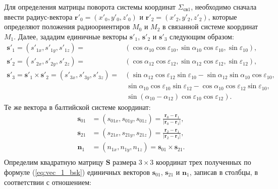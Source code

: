 \documentclass[../main.tex]{subfiles}
\begin{document}
Для определения матрицы поворота системы координат $\Sigma_{\text{св}1}$, необходимо сначала ввести радиус-вектора $\mathbf{r}'_0 = \left(x'_0, y'_0, z'_0\right)$ и $\mathbf{r}'_2 = \left(x'_2, y'_2, z'_2\right)$, которые определяют положения радиоориентиров $M_0$ и $M_2$ в связанной системе координат $M_1$. Далее, зададим единичные векторы $\mathbf{s}'_1$, $\mathbf{s}'_2$ и $\mathbf{s}'_3$ следующим образом:
\begin{equation}\label{eq:vec_1_local}
    \begin{split}
    \mathbf{s}'_1 = \left(s'_{1x}, s'_{1y}, s'_{1z}\right) = &\left(\cos\alpha_{10} \cos\varepsilon_{10}, \sin\alpha_{10}\cos\varepsilon_{10}, \sin\varepsilon_{10}\right),\\
    \mathbf{s}'_2 = \left(s'_{2x}, s'_{2y}, s'_{2z}\right) = &\left(\cos\alpha_{12} \cos\varepsilon_{12}, \sin\alpha_{12}\cos\varepsilon_{12}, \sin\varepsilon_{12}\right),\\
    \mathbf{s}'_3 = \mathbf{s}'_1 \times \mathbf{s}'_2 = \left(s'_{3x}, s'_{3y}, s'_{3z}\right) = &\left(\sin\alpha_{12}\cos\varepsilon_{12}\sin\varepsilon_{10} - \sin\alpha_{12}\sin\alpha_{10}\cos\varepsilon_{10},\right.\\
    &\ \sin\alpha_{10}\cos\varepsilon_{10}\sin\varepsilon_{12} - \cos\alpha_{10}\cos\varepsilon_{12}\sin\varepsilon_{10},\\
    &\ \left.\sin\left(\alpha_{10} - \alpha_{12}\right)\cos\varepsilon_{10}\cos\varepsilon_{12}\right).
    \end{split}
\end{equation}
Те же вектора в балтийской системе координат:
\begin{equation}\label{eq:vec_1_bsk}
    \begin{split}
        \mathbf{s}_{01} &= \left(s_{01x}, s_{01y}, s_{01z}\right) = \frac{\mathbf{r}_0 - \mathbf{r}_1}{|\mathbf{r}_0 - \mathbf{r}_1|},\\
        \mathbf{s}_{21} &= \left(s_{21x}, s_{21y}, s_{21z}\right) = \frac{\mathbf{r}_2 - \mathbf{r}_1}{|\mathbf{r}_2 - \mathbf{r}_1|},\\
        \mathbf{n}_1 &= \left(n_{1x}, n_{1y}, n_{1z}\right) = \mathbf{s}_{01} \times \mathbf{s}_{21}.\\
    \end{split}
\end{equation}
Определим квадратную матрицу $\mathbf{S}$ размера $3 \times 3$ координат трех полученных по формуле (\ref{eq:vec_1_bsk}) единичных векторов $\mathbf{s}_{01}$, $\mathbf{s}_{21}$ и $\mathbf{n}_{1}$, записав в столбцы, в соответствии с отношением:
\end{document}

